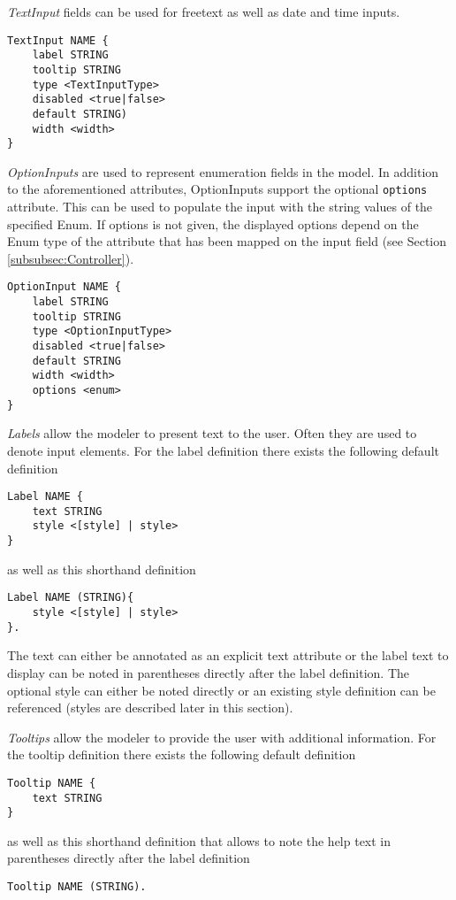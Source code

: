 \textit{TextInput} fields can be used for freetext as well as date and time inputs.
\begin{lstlisting}
TextInput NAME { 
	label STRING
	tooltip STRING
	type <TextInputType>
	disabled <true|false>
	default STRING)
	width <width>
}
\end{lstlisting}

\textit{OptionInputs} are used to represent enumeration fields in the model. In addition to the aforementioned attributes, OptionInputs support the optional \lstinline!options! attribute. This can be used to populate the input with the string values of the specified Enum. If options is not given, the displayed options depend on the Enum type of the attribute that has been mapped on the input field (see Section \ref{subsubsec:Controller}).
\begin{lstlisting}
OptionInput NAME { 
	label STRING
	tooltip STRING
	type <OptionInputType>
	disabled <true|false>
	default STRING
	width <width>
	options <enum>
}
\end{lstlisting}

\textit{Labels} allow the modeler to present text to the user. Often they are used to denote input elements. For the label definition there exists the following default definition
\begin{lstlisting}
Label NAME {
	text STRING
	style <[style] | style>
}
\end{lstlisting}
as well as this shorthand definition
\begin{lstlisting}
Label NAME (STRING){
	style <[style] | style>
}.
\end{lstlisting}

The text can either be annotated as an explicit text attribute or the label text to display can be noted in parentheses directly after the label definition. The optional style can either be noted directly or an existing style definition can be referenced (styles are described later in this section).

\textit{Tooltips} allow the modeler to provide the user with additional information. For the tooltip definition there exists the following default definition
\begin{lstlisting}
Tooltip NAME {
	text STRING
}
\end{lstlisting}

as well as this shorthand definition that allows to note the help text in parentheses directly after the label definition
\begin{lstlisting}
Tooltip NAME (STRING).
\end{lstlisting}

